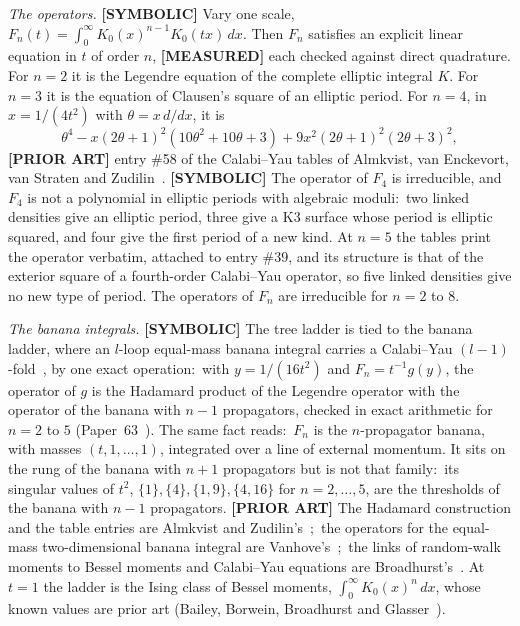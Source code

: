 \documentclass[aps,pra,twocolumn,superscriptaddress,longbibliography]{revtex4-2}
\newcommand{\gvc}[2]{#2}
\begin{document}
\emph{The operators.}  \textbf{[SYMBOLIC]} Vary one scale,
$F_n(t)=\int_0^\infty K_0(x)^{n-1}K_0(tx)\,dx$.  Then $F_n$ satisfies an
explicit linear equation in $t$ of order $n$, \textbf{[MEASURED]} each
checked against direct quadrature.  For $n=2$ it is the Legendre equation
of the complete elliptic integral $K$.  For $n=3$ it is the equation of
Clausen's square of an elliptic period.  For $n=4$, in $x=1/(4t^2)$ with
$\theta=x\,d/dx$, it is
\begin{equation}
  \theta^4 - x(2\theta+1)^2(10\theta^2+10\theta+3)
  + 9x^2(2\theta+1)^2(2\theta+3)^2 ,
  \label{eq:f4}
\end{equation}
\textbf{[PRIOR ART]} entry \#58 of the Calabi--Yau tables of Almkvist,
van Enckevort, van Straten and Zudilin~\cite{aesz2005}.
\textbf{[SYMBOLIC]} The operator of $F_4$ is irreducible, and $F_4$ is
not a polynomial in elliptic periods with algebraic moduli:\ two linked
densities give an elliptic period, three give a K3 surface whose period
is elliptic squared, and four give the first period of a new kind.  At
$n=5$ the tables print the operator verbatim, attached to entry \#39, and
its structure is that of the exterior square of a fourth-order
Calabi--Yau operator, so five linked densities give no new type of
period.  The operators of $F_n$ are irreducible for $n=2$ to $8$.

\emph{The banana integrals.}  \textbf{[SYMBOLIC]}
\gvc{p59-tree-banana-hadamard}{The tree ladder is tied to the banana
ladder, where an $l$-loop equal-mass banana integral carries a
Calabi--Yau $(l-1)$-fold~\cite{bonisch2021}, by one exact operation:\
with $y=1/(16t^2)$ and $F_n=t^{-1}g(y)$, the operator of $g$ is the
Hadamard product of the Legendre operator with the operator of the banana
with $n-1$ propagators, checked in exact arithmetic for $n=2$ to $5$}
(Paper~63~\cite{loutey_paper63}).  The same fact reads:\ $F_n$ is the
$n$-propagator banana, with masses $(t,1,\dots,1)$, integrated over a
line of external momentum.  It sits on the rung of the banana with
$n+1$ propagators but is not that family:\ its singular values of $t^2$,
$\{1\},\{4\},\{1,9\},\{4,16\}$ for $n=2,\dots,5$, are the thresholds of the
banana with $n-1$ propagators.  \textbf{[PRIOR ART]} The Hadamard
construction and the table entries are Almkvist and
Zudilin's~\cite{almkvist_zudilin2007,aesz2005};\ the operators for the
equal-mass two-dimensional banana integral are
Vanhove's~\cite{vanhove2014};\ the links of random-walk
moments to Bessel moments and Calabi--Yau equations are
Broadhurst's~\cite{broadhurst2009walks}.  At $t=1$ the ladder is the
Ising class of Bessel moments, $\int_0^\infty K_0(x)^n\,dx$, whose known values are prior art
(Bailey, Borwein, Broadhurst and Glasser~\cite{bbbg2008}).
\end{document}

